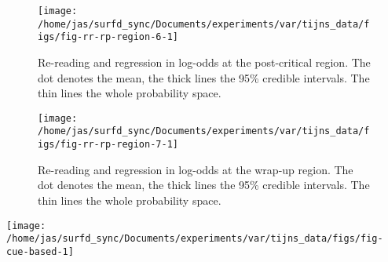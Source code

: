 \begin{knitrout}
\color{fgcolor}\begin{figure}
\texttt{[image: /home/jas/surfd\_sync/Documents/experiments/var/tijns\_data/figs/fig-rr-rp-region-6-1]} \caption{\label{fig:r6-rr-rp}Re-reading and regression in log-odds at the post-critical region. The dot denotes the mean, the thick lines the 95\% credible intervals. The thin lines the whole probability space.}\label{fig:fig-rr-rp-region-6}
\end{figure}

\end{knitrout}

\begin{knitrout}
\color{fgcolor}\begin{figure}
\texttt{[image: /home/jas/surfd\_sync/Documents/experiments/var/tijns\_data/figs/fig-rr-rp-region-7-1]} \caption{\label{fig:r7-rr-rp}Re-reading and regression in log-odds at the wrap-up region. The dot denotes the mean, the thick lines the 95\% credible intervals. The thin lines the whole probability space.}\label{fig:fig-rr-rp-region-7}
\end{figure}

\end{knitrout}

\begin{knitrout}
\color{fgcolor}
\texttt{[image: /home/jas/surfd\_sync/Documents/experiments/var/tijns\_data/figs/fig-cue-based-1]} 
\end{knitrout}
